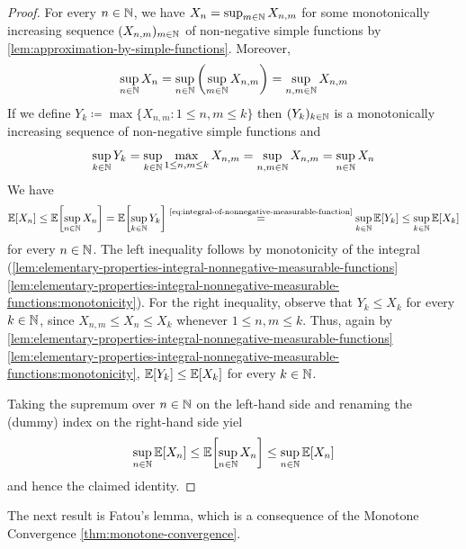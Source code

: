 \begin{proof}
For every $n \in \mathbb{N}$, we have
\(
X_n
=
\sup_{m\in\mathbb{N}}X_{n,m}
\)
for some monotonically increasing sequence $(X_{n,m})_{m\in\mathbb{N}}$ of non-negative simple functions
by \autoref{lem:approximation-by-simple-functions}.
Moreover,
\[
\sup_{n\in\mathbb{N}}X_n
=
\sup_{n\in\mathbb{N}}\left(\sup_{m\in\mathbb{N}}X_{n,m}\right)
= 
\sup_{n,m\in\mathbb{N}}X_{n,m}
\]
If we define
\(
Y_k
\coloneq
\max\{X_{n,m}:1\leq n,m\leq k\}
\)
then $(Y_k)_{k\in\mathbb{N}}$ is a monotonically increasing sequence of non-negative simple functions and
\[
\sup_{k\in\mathbb{N}}Y_k
= 
\sup_{k\in\mathbb{N}}\max_{1\leq n,m\leq k}X_{n,m}
=
\sup_{n,m\in\mathbb{N}}X_{n,m}
=
\sup_{n\in\mathbb{N}}X_n
\]
We have
\[
\operatorname{\mathbb{E}}[X_n]
\leq
\operatorname{\mathbb{E}}\biggl[\sup_{n\in\mathbb{N}}X_n\biggr]
=
\operatorname{\mathbb{E}}\biggl[\sup_{k\in\mathbb{N}}Y_k\biggr]
\overset{\text{\eqref{eq:integral-of-nonnegative-measurable-function}}}{=}
\sup_{k\in\mathbb{N}}\operatorname{\mathbb{E}}[Y_k]
\leq
\sup_{k\in\mathbb{N}}\operatorname{\mathbb{E}}[X_k]
\]
for every $n\in\mathbb{N}$.
The left inequality follows by monotonicity of the integral (\autoref{lem:elementary-properties-integral-nonnegative-measurable-functions} \ref{lem:elementary-properties-integral-nonnegative-measurable-functions:monotonicity}).
For the right inequality, observe that $Y_k \leq X_k$ for every $k\in\mathbb{N}$, since $X_{n,m}\leq X_n\leq X_k$ whenever $1\leq n,m\leq k$.
Thus, again by \autoref{lem:elementary-properties-integral-nonnegative-measurable-functions} \ref{lem:elementary-properties-integral-nonnegative-measurable-functions:monotonicity}, $\operatorname{\mathbb{E}}[Y_k]\leq\operatorname{\mathbb{E}}[X_k]$ for every $k\in\mathbb{N}$.


Taking the supremum over $n\in\mathbb{N}$ on the left-hand side 
and
renaming the (dummy) index 
on the right-hand side
yiel 
\[
\sup_{n\in\mathbb{N}}\operatorname{\mathbb{E}}[X_n]
\leq
\operatorname{\mathbb{E}}\biggl[\sup_{n\in\mathbb{N}}X_n\biggr]
\leq
\sup_{n\in\mathbb{N}}\operatorname{\mathbb{E}}[X_n]
\]
and hence the claimed identity.
\end{proof}

The next result is Fatou's lemma, which is a consequence of the Monotone Convergence \autoref{thm:monotone-convergence}.

